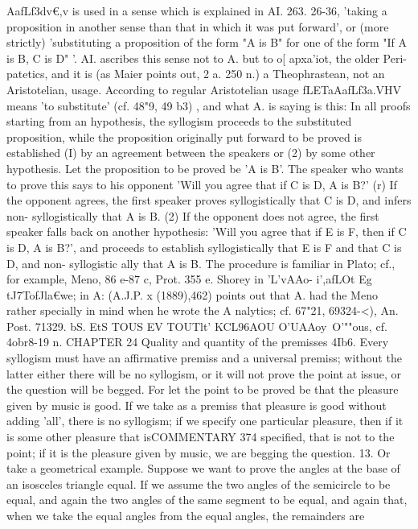 {{{{{{{{{{{{{{AafLf3dv€,v is used in a sense which is explained in AI. 263. 26-36,
'taking a proposition in another sense than that in which it was
put forward', or (more strictly) 'substituting a proposition of the
form "A is B" for one of the form "If A is B, C is D" '. AI.
ascribes this sense not to A. but to o[ apxa'iot, the older Peri-
patetics, and it is (as Maier points out, 2 a. 250 n.) a Theophrastean,
not an Aristotelian, usage. According to regular Aristotelian
usage fLETaAafLf3a.VHV means 'to substitute' (cf. 48"9, 49 b3) , and
what A. is saying is this: In all proofs starting from an hypothesis,
the syllogism proceeds to the substituted proposition, while the
proposition originally put forward to be proved is established (I)
by an agreement between the speakers or (2) by some other
hypothesis. Let the proposition to be proved be 'A is B'. The
speaker who wants to prove this says to his opponent 'Will you
agree that if C is D, A is B?' (r) If the opponent agrees, the first
speaker proves syllogistically that C is D, and infers non-
syllogistically that A is B. (2) If the opponent does not agree,
the first speaker falls back on another hypothesis: 'Will you
agree that if E is F, then if C is D, A is B?', and proceeds to
establish syllogistically that E is F and that C is D, and non-
syllogistic ally that A is B. The procedure is familiar in Plato;
cf., for example, Meno, 86 e-87 c, Prot. 355 e. Shorey in 'L'vAAo-
i',afLOt Eg tJ7TofJla€we; in A: (A.J.P. x (1889),462) points out that
A. had the Meno rather specially in mind when he wrote the
A nalytics; cf. 67"21, 69324-<), An. Post. 71329.
bS. EtS TOUS EV TOUTlt' KCL96AOU O'UAAoy~O'""ous, cf. 4obr8-19 n.
CHAPTER 24
Quality and quantity of the premisses
4Ib6. Every syllogism must have an affirmative premiss and a
universal premiss; without the latter either there will be no
syllogism, or it will not prove the point at issue, or the question
will be begged. For let the point to be proved be that the pleasure
given by music is good. If we take as a premiss that pleasure is
good without adding 'all', there is no syllogism; if we specify one
particular pleasure, then if it is some other pleasure that isCOMMENTARY
374
specified, that is not to the point; if it is the pleasure given by
music, we are begging the question.
13. Or take a geometrical example. Suppose we want to prove
the angles at the base of an isosceles triangle equal. If we assume
the two angles of the semicircle to be equal, and again the two
angles of the same segment to be equal, and again that, when we
take the equal angles from the equal angles, the remainders are
}}}}}}}}}}}}}}
